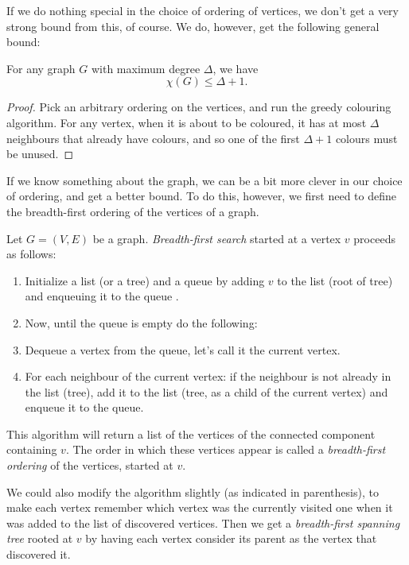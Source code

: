 \documentclass[nobib]{tufte-handout}
\begin{document}
If we do nothing special in the choice of ordering of vertices, we don't get a very strong bound from this, of course. We do, however, get the following general bound:

\begin{lemma}\label{lemma:trivial_chi_upper_bound}
  For any graph $G$ with maximum degree $\Delta$, we have
  $$\chi(G) \leq \Delta + 1.$$

  \begin{proof}
    Pick an arbitrary ordering on the vertices, and run the greedy colouring algorithm. For any vertex, when it is about to be coloured, it has at most $\Delta$ neighbours that already have colours, and so one of the first $\Delta + 1$ colours must be unused.
  \end{proof}
\end{lemma}

If we know something about the graph, we can be a bit more clever in our choice of ordering, and get a better bound. To do this, however, we first need to define the breadth-first ordering of the vertices of a graph.

\begin{definition}
  Let $G = (V,E)$ be a graph. \emph{Breadth-first search} started at a vertex $v$ proceeds as follows:
  \begin{enumerate}
    \item Initialize a list (or a tree) and a queue by adding \(v\) to the list (root of tree) and enqueuing it to the queue .
    \item Now, until the queue is empty do the following:
    \item Dequeue a vertex from the queue, let's call it the current vertex.
    \item For each neighbour of the current vertex: if the neighbour is not already in the list (tree), add it to the list (tree, as a child of the current vertex) and enqueue it to the queue.
  \end{enumerate}

  This algorithm will return a list of the vertices of the connected component containing $v$. The order in which these vertices appear is called a \emph{breadth-first ordering} of the vertices, started at $v$. 
  
  We could also modify the algorithm slightly (as indicated in parenthesis), to make each vertex remember which vertex was the currently visited one when it was added to the list of discovered vertices. Then we get a \emph{breadth-first spanning tree} rooted at $v$ by having each vertex consider its parent as the vertex that discovered it.
\end{definition}
\end{document}

